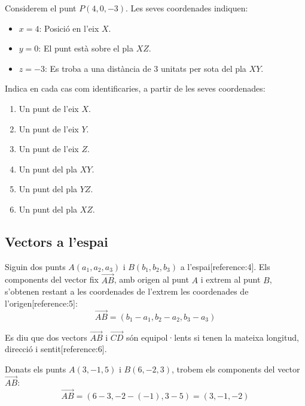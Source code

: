 \documentclass[12pt]{article}
\begin{document}
\begin{exemple}
Considerem el punt $P(4, 0, -3)$. Les seves coordenades indiquen:
\begin{itemize}
    \item $x = 4$: Posició en l'eix $X$.
    \item $y = 0$: El punt està sobre el pla $XZ$.
    \item $z = -3$: Es troba a una distància de $3$ unitats per sota del pla $XY$.
\end{itemize}
\end{exemple}

\begin{exercici}
Indica en cada cas com identificaries, a partir de les seves coordenades:
\begin{enumerate}
    \item Un punt de l'eix $X$.
    \item Un punt de l'eix $Y$.
    \item Un punt de l'eix $Z$.
    \item Un punt del pla $XY$.
    \item Un punt del pla $YZ$.
    \item Un punt del pla $XZ$.
\end{enumerate}
\end{exercici}

\subsection{Vectors a l'espai}

\begin{concept}
Siguin dos punts $A(a_1, a_2, a_3)$ i $B(b_1, b_2, b_3)$ a l'espai[reference:4]. Els components del vector fix $\overrightarrow{AB}$, amb origen al punt $A$ i extrem al punt $B$, s'obtenen restant a les coordenades de l'extrem les coordenades de l'origen[reference:5]:
\[
\overrightarrow{AB} = (b_1 - a_1, b_2 - a_2, b_3 - a_3)
\]

Es diu que dos vectors $\overrightarrow{AB}$ i $\overrightarrow{CD}$ són equipol·lents si tenen la mateixa longitud, direcció i sentit[reference:6].
\end{concept}

\begin{exemple}
Donats els punts $A(3, -1, 5)$ i $B(6, -2, 3)$, trobem els components del vector $\overrightarrow{AB}$:
\[
\overrightarrow{AB} = (6 - 3, -2 - (-1), 3 - 5) = (3, -1, -2)
\]
\end{exemple}
\end{document}
